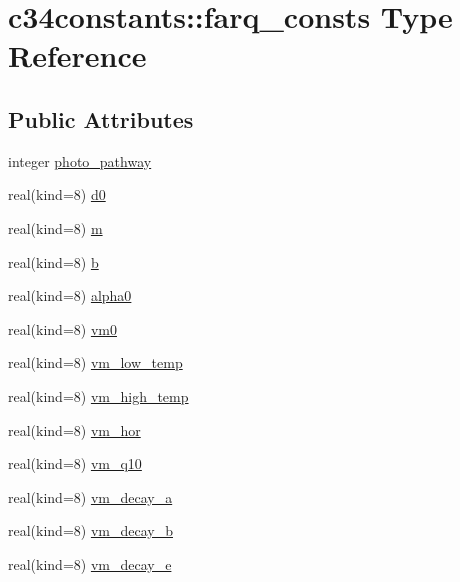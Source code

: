 \hypertarget{structc34constants_1_1farq__consts}{}\section{c34constants\+:\+:farq\+\_\+consts Type Reference}
\label{structc34constants_1_1farq__consts}
\subsection*{Public Attributes}
\begin{DoxyCompactItemize}
\item 
integer \hyperlink{structc34constants_1_1farq__consts_a825851b4b540d13a80d9cdbc876bc58a}{photo\+\_\+pathway}
\item 
real(kind=8) \hyperlink{structc34constants_1_1farq__consts_ae8edb029d2bb0b51d6321d09650b5cf4}{d0}
\item 
real(kind=8) \hyperlink{structc34constants_1_1farq__consts_a0e4e6c0cf8894cafd7865d87fd6777a5}{m}
\item 
real(kind=8) \hyperlink{structc34constants_1_1farq__consts_a02ff4801f693aa83da862b00607461d3}{b}
\item 
real(kind=8) \hyperlink{structc34constants_1_1farq__consts_ac07e1eade4d8432242f00aafbbc04b32}{alpha0}
\item 
real(kind=8) \hyperlink{structc34constants_1_1farq__consts_a293191bda2ddf1bfb5259b559ed677d5}{vm0}
\item 
real(kind=8) \hyperlink{structc34constants_1_1farq__consts_aa0c49273cd30fbedcbcb5a82328dff15}{vm\+\_\+low\+\_\+temp}
\item 
real(kind=8) \hyperlink{structc34constants_1_1farq__consts_a0c4fb6c3e47624e7f62af6a74398c4ac}{vm\+\_\+high\+\_\+temp}
\item 
real(kind=8) \hyperlink{structc34constants_1_1farq__consts_a6124314ecc5a20b117ede014aebb6169}{vm\+\_\+hor}
\item 
real(kind=8) \hyperlink{structc34constants_1_1farq__consts_a6f62b2ef08a8e18c71f2af508abeb173}{vm\+\_\+q10}
\item 
real(kind=8) \hyperlink{structc34constants_1_1farq__consts_abcf0963ea16192612125b2d732039319}{vm\+\_\+decay\+\_\+a}
\item 
real(kind=8) \hyperlink{structc34constants_1_1farq__consts_a160803b73b3b156097b502bf2c2542aa}{vm\+\_\+decay\+\_\+b}
\item 
real(kind=8) \hyperlink{structc34constants_1_1farq__consts_adca5c806eb6c77c4e126e644acc7269b}{vm\+\_\+decay\+\_\+e}

\end{DoxyCompactItemize}
